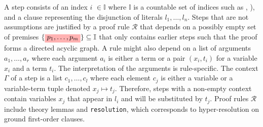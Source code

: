 A step %
consists of an index \colorbox{indexClr!30}{$i$} $\in \mathbb{I}$ where $\mathbb{I}$ is a countable set of indices such as , ), and a clause representing the disjunction of literals \colorbox{green!30}{$l_1, \dots, l_n$}.
Steps that are not assumptions are justified by a proof rule \colorbox{purple!30}{$\mathcal{R}$} that depends on a possibly empty set of premises $\{\colorbox{red!30}{$p_1, \dots,  p_m$}\} \subseteq \mathbb{I}$ that only contains earlier steps such that the proof forms
a directed acyclic graph. A rule might also depend on a list of arguments \colorbox{orange!30}{$a_1, \dots, a_r$} where each argument $a_i$ is either a term or a pair $(x_i, t_i)$ for a variable $x_i$ and a term $t_i$.
The interpretation of the arguments is rule-specific. The context \colorbox{blue!30}{$\Gamma$} of a step is a list $c_1, \dots, c_l $ where each element $c_j$ is either a variable or a variable-term tuple denoted $x_j \mapsto t_j$.
Therefore, steps with a non-empty context contain variables $x_j$ that appear in \colorbox{green!30}{$l_i$} and will be substituted by $t_j$. Proof rules \colorbox{purple!30}{$\mathcal{R}$} include theory lemmas and \texttt{resolution}, which corresponds to hyper-resolution on ground first-order clauses.

